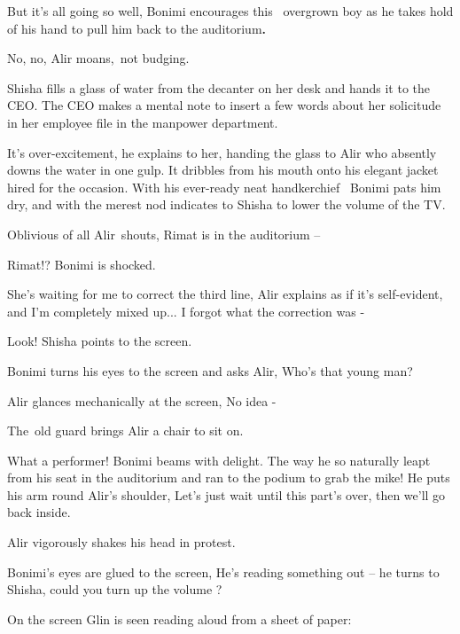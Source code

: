 \documentclass[letterpaper]{article}
\begin{document}
{\textquotedbl}But it's all going so well,{\textquotedbl} Bonimi encourages this {\ }overgrown boy as he
takes hold of his hand to pull him back to the auditorium\textbf{. }

{\textquotedbl}No, no,{\textquotedbl} Alir moans,~not budging.

Shisha fills a glass of water from the decanter on her desk and hands it to the CEO. The CEO makes a mental note to
insert a few words about her solicitude in her employee file in the manpower department. 

{\textquotedbl}It's over-excitement,{\textquotedbl} he explains to her, handing the glass to Alir who absently downs the
water in one gulp. It dribbles from his mouth onto his elegant jacket hired for the occasion. With his ever-ready neat
handkerchief \ Bonimi pats him dry, and with the merest nod indicates to Shisha to lower the volume of the TV.

Oblivious of all Alir~shouts, {\textquotedbl}Rimat is in the auditorium --{\textquotedbl} 

{\textquotedbl}Rimat!?{\textquotedbl} Bonimi is shocked. 

{\textquotedbl}She's waiting for me to correct the third line,{\textquotedbl} Alir explains as if it's self-evident,
{\textquotedbl}and I'm completely mixed up... I forgot what the correction was -{\textquotedbl}

{\textquotedbl}Look!{\textquotedbl} Shisha points to the screen.

Bonimi turns his eyes to the screen and asks Alir, {\textquotedbl}Who's that young man?{\textquotedbl} 

Alir glances mechanically at the screen, {\textquotedbl}No idea -{\textquotedbl}

The~old guard brings Alir a chair to sit on.

{\textquotedbl}What a performer!{\textquotedbl} Bonimi beams with delight. {\textquotedbl}The way he so naturally leapt
from his seat in the auditorium and ran to the podium to grab the mike!{\textquotedbl} He puts his arm round Alir's
shoulder, {\textquotedbl}Let's just wait until this part's over, then we'll go back inside.{\textquotedbl} 

Alir vigorously shakes his head in protest. 

Bonimi's eyes are glued to the screen, {\textquotedbl}He's reading something out --{\textquotedbl} he turns to Shisha,
{\textquotedbl}could you turn up the volume ?{\textquotedbl}

On the screen Glin is seen reading aloud from a sheet of paper:
\end{document}
